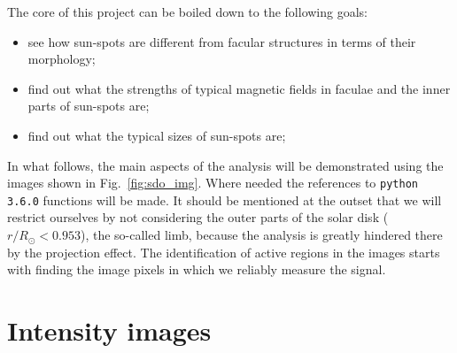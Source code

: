 \documentclass[paper=a4, fontsize=11pt]{article}
\numberwithin{equation}{section}
\numberwithin{figure}{section}
\numberwithin{table}{section}
\begin{document}
The core of this project can be boiled down to the following goals:
\begin{itemize}
\item see how sun-spots are different from facular structures in terms of their morphology;
\item find out what the strengths of typical magnetic fields in faculae and the inner parts of sun-spots are;
\item find out what the typical sizes of sun-spots are;
\end{itemize}
In what follows, the main aspects of the analysis will be demonstrated using the images shown in Fig.~\ref{fig:sdo_img}.
Where needed the references to \texttt{python 3.6.0} functions will be made.
It should be mentioned at the outset that we will restrict ourselves by not considering the
outer parts of the solar disk ($r / R_\odot < 0.953$), the so-called limb, because the analysis is greatly hindered there
by the projection effect.
The identification of active regions in the images starts with finding the image pixels in which we reliably measure the signal.

\section{Intensity images}
\end{document}
